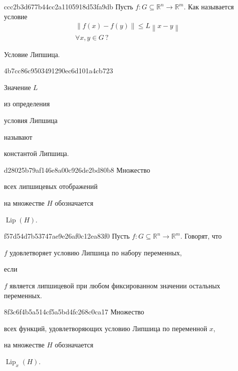 \begin{note}{ccc2b3d677b44cc2a1105918d53fa9db}
    Пусть \({ f : G \subseteq \mathbb R^{n} \to \mathbb R^{m} }\).
    Как называется условие
    \begin{gather*}
        \left\lVert f(x) - f(y) \right\rVert \leqslant L\left\lVert x - y \right\rVert \\
        \forall x, y \in G\,?
    \end{gather*}

    \begin{cloze}{1}
        Условие Липшица.
    \end{cloze}
\end{note}

\begin{note}{4b7cc86c9503491290ec6d101a4cb723}
    \begin{icloze}{2}Значение \({ L }\)\end{icloze} из определения \begin{icloze}{2}условия Липшица\end{icloze} называют \begin{icloze}{1}константой Липшица.\end{icloze}
\end{note}

\begin{note}{d28025b79af146e8a00c926de2bd80b8}
    Множество \begin{icloze}{2}всех липшицевых отображений\end{icloze} на множестве \({ H }\) обозначается \begin{icloze}{1}\({ \operatorname{Lip}(H) }\).\end{icloze}
\end{note}

\begin{note}{f57d54d7b53747ae9e26af0c12ea83f0}
    Пусть \({ f : G \subseteq \mathbb R^{n} \to \mathbb R^{m} }\).
    Говорят, что \begin{icloze}{2}\({ f }\) удовлетворяет условию Липшица по набору переменных,\end{icloze} если
    \begin{icloze}{1}
        \({ f }\) является липшицевой при любом фиксированном значении остальных переменных.
    \end{icloze}
\end{note}

\begin{note}{8f3c6f4b5a514cf5a5bd4fc268c0ca17}
    Множество \begin{icloze}{2}всех функций, удовлетворяющих условию Липшица по переменной \({ x }\),\end{icloze} на множестве \({ H }\) обозначается \begin{icloze}{1}\({ \operatorname{Lip}_x (H) }\).\end{icloze}
\end{note}

